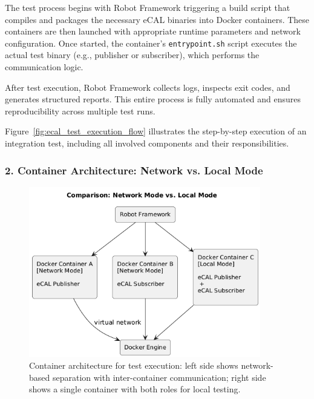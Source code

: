 The test process begins with Robot Framework triggering a build script that compiles and packages the necessary eCAL binaries into Docker containers. These containers are then launched with appropriate runtime parameters and network configuration. Once started, the container's \texttt{entrypoint.sh} script executes the actual test binary (e.g., publisher or subscriber), which performs the communication logic. 

\vspace{1em}
After test execution, Robot Framework collects logs, inspects exit codes, and generates structured reports. This entire process is fully automated and ensures reproducibility across multiple test runs.

\vspace{1em}
Figure~\ref{fig:ecal_test_execution_flow} illustrates the step-by-step execution of an integration test, including all involved components and their responsibilities.

\vspace{1em}
\subsubsection*{2. Container Architecture: Network vs. Local Mode}

\begin{figure}[H]
	\centering
	\includegraphics[width=0.9\textwidth]{Images/test_architecture_diagram3.png}
	\caption{Container architecture for test execution: left side shows network-based separation with inter-container communication; right side shows a single container with both roles for local testing.}
	\label{fig:ecal_container_architecture}
\end{figure}

